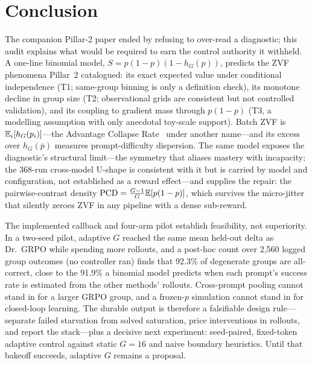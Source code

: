\section{Conclusion}
\label{sec:p7-conclusion}
The companion Pillar-2 paper ended by refusing to over-read a diagnostic;
this audit explains what would be required to earn the control authority it
withheld. A one-line binomial model,
$S = p(1-p)(1 - h_G(p))$, predicts the ZVF phenomena Pillar~2 catalogued:
its exact expected value under conditional independence (T1; same-group
binning is only a definition check), its monotone decline in group size
(T2; observational grids are consistent but not controlled validation), and its coupling to gradient mass through
$p(1-p)$ (T3, a modelling assumption with only anecdotal toy-scale support).
Batch ZVF is $\mathbb{E}_i[h_G(p_i)]$---the Advantage Collapse Rate~\citep{he2026advantage}
under another name---and its excess over $h_G(\bar p)$ measures
prompt-difficulty dispersion. The same model exposes the diagnostic's
structural limit---the symmetry that aliases mastery with incapacity; the
368-run cross-model U-shape is consistent with it but is carried by model
and configuration, not established as a reward effect---and supplies the
repair: the pairwise-contrast density
$\mathrm{PCD} = \frac{G-1}{G}\mathbb{E}[p(1-p)]$, which survives the micro-jitter
that silently zeroes ZVF in any pipeline with a dense sub-reward.

The implemented callback and four-arm pilot establish feasibility, not
superiority. In a two-seed pilot, adaptive $G$ reached the same mean held-out delta as
Dr.~GRPO while spending more rollouts, and a post-hoc count over 2,560 logged
group outcomes (no controller ran) finds that 92.3\% of degenerate groups are
all-correct, close to the 91.9\% a binomial model predicts when each prompt's
success rate is estimated from the other methods' rollouts. Cross-prompt pooling
cannot stand in for a larger GRPO group, and a frozen-$p$ simulation cannot stand
in for closed-loop learning. The durable output is therefore a falsifiable design
rule---separate failed starvation from solved saturation, price interventions in
rollouts, and report the stack---plus a decisive next experiment: seed-paired,
fixed-token adaptive control against static $G{=}16$ and naive boundary
heuristics. Until that bakeoff succeeds, adaptive $G$ remains a proposal.
